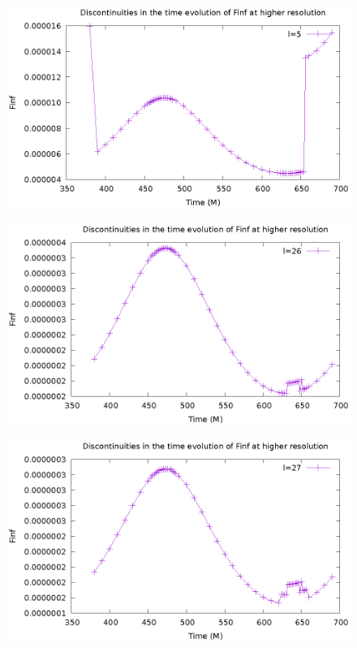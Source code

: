 \documentclass{article}
\begin{document}
\begin{figure}
  \includegraphics{FinfTimel5}
\end{figure}
\begin{figure}
  \includegraphics{FinfTimel26}
\end{figure}
\begin{figure}
  \includegraphics{FinfTimel27}
\end{figure}
\end{document}
